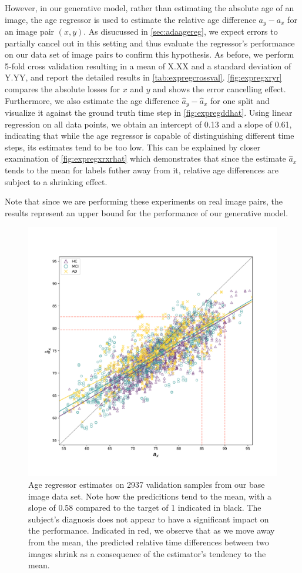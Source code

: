 However, in our generative model, rather than estimating the absolute age of an image, the age regressor is used to estimate the relative age difference $a_y - a_x$ for an image pair $(x, y)$. As disucussed in \autoref{sec:adaagereg}, we expect errors to partially cancel out in this setting and thus evaluate the regressor's performance on our data set of image pairs to confirm this hypothesis. As before, we perform 5-fold cross validation resulting in a mean of X.XX and a standard deviation of Y.YY, and report the detailed results in \autoref{tab:expregcrossval}. \autoref{fig:expregxryr} compares the absolute losses for $x$ and $y$ and shows the error cancelling effect. Furthermore, we also estimate the age difference $\hat a_y - \hat a_x$ for one split and visualize it against the ground truth time step in \autoref{fig:expregddhat}. Using linear regression on all data points, we obtain an intercept of 0.13 and a slope of 0.61, indicating that while the age regressor is capable of distinguishing different time steps, its estimates tend to be too low. This can be explained by closer examination of \autoref{fig:expregxrxrhat} which demonstrates that since the estimate $\hat a_x$ tends to the mean for labels futher away from it, relative age differences are subject to a shrinking effect. 

Note that since we are performing these experiments on real image pairs, the results represent an upper bound for the performance of our generative model.

\begin{figure}
	\centering
	\includegraphics[width=.85\linewidth]{images/age_plots/xr_xrhat} 
	\vspace*{-15pt}
	\caption{Age regressor estimates on 2937 validation samples from our base image data set. Note how the predicitions tend to the mean, with a slope of 0.58 compared to the target of 1 indicated in black. The subject's diagnosis does not appear to have a significant impact on the performance. Indicated in red, we observe that as we move away from the mean, the predicted relative time differences between two images shrink as a consequence of the estimator's tendency to the mean.}
	\label{fig:expregxrxrhat}
\end{figure}

